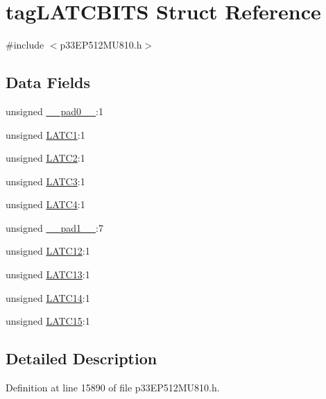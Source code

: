 \hypertarget{structtag_l_a_t_c_b_i_t_s}{}\section{tag\+L\+A\+T\+C\+B\+I\+TS Struct Reference}
\label{structtag_l_a_t_c_b_i_t_s}


{\ttfamily \#include $<$p33\+E\+P512\+M\+U810.\+h$>$}

\subsection*{Data Fields}
\begin{DoxyCompactItemize}
\item 
unsigned \hyperlink{structtag_l_a_t_c_b_i_t_s_adf71f3d8410c1f1dbbc96680a92c49af}{\+\_\+\+\_\+pad0\+\_\+\+\_\+}\+:1
\item 
unsigned \hyperlink{structtag_l_a_t_c_b_i_t_s_aca64c17d86197b03c59989f652bf8b64}{L\+A\+T\+C1}\+:1
\item 
unsigned \hyperlink{structtag_l_a_t_c_b_i_t_s_a2a587811fb903e7f3e4462fd8d789df3}{L\+A\+T\+C2}\+:1
\item 
unsigned \hyperlink{structtag_l_a_t_c_b_i_t_s_a00c607221d4806a6d99270611ad8474f}{L\+A\+T\+C3}\+:1
\item 
unsigned \hyperlink{structtag_l_a_t_c_b_i_t_s_a552fc80c0dd1a68538a10e5711aa39fa}{L\+A\+T\+C4}\+:1
\item 
unsigned \hyperlink{structtag_l_a_t_c_b_i_t_s_acaf2d0924a107ec6e8d2e31febaf66f9}{\+\_\+\+\_\+pad1\+\_\+\+\_\+}\+:7
\item 
unsigned \hyperlink{structtag_l_a_t_c_b_i_t_s_a7057868e5c284358f7d96aa3bf8ed7fc}{L\+A\+T\+C12}\+:1
\item 
unsigned \hyperlink{structtag_l_a_t_c_b_i_t_s_ab1a99b30927582c6ab183c465b26f6f0}{L\+A\+T\+C13}\+:1
\item 
unsigned \hyperlink{structtag_l_a_t_c_b_i_t_s_a82f7715d03181557258a0a48a5d61527}{L\+A\+T\+C14}\+:1
\item 
unsigned \hyperlink{structtag_l_a_t_c_b_i_t_s_a1c0eb77507ef72afc1e7acf86dff1314}{L\+A\+T\+C15}\+:1
\end{DoxyCompactItemize}


\subsection{Detailed Description}


Definition at line 15890 of file p33\+E\+P512\+M\+U810.\+h.



